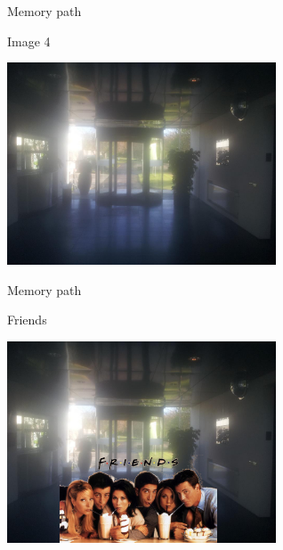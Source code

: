 \begin{frame}{Memory path}
  \begin{block}{Image 4}
    \begin{center}
      \includegraphics[height=6cm]{img/loci/04.jpg}
    \end{center}
  \end{block}
\end{frame}
\begin{frame}{Memory path}
  \begin{block}{Friends}
    \begin{center}
      \includegraphics[height=6cm]{img/loci/04-friends.jpg}
    \end{center}
  \end{block}
\end{frame}

